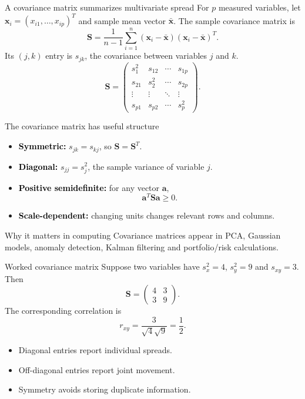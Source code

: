 \documentclass[aspectratio=169,11pt]{beamer}
\newcommand{\key}[1]{\textcolor{black}{\textbf{#1}}}
\begin{document}
\begin{frame}{A covariance matrix summarizes multivariate spread}
For $p$ measured variables, let $\mathbf{x}_i=(x_{i1},\ldots,x_{ip})^T$ and sample mean vector $\bar{\mathbf{x}}$. The sample covariance matrix is
\[
\boxed{\mathbf{S}=\frac{1}{n-1}\sum_{i=1}^{n}(\mathbf{x}_i-\bar{\mathbf{x}})(\mathbf{x}_i-\bar{\mathbf{x}})^T}.
\]
Its $(j,k)$ entry is $s_{jk}$, the covariance between variables $j$ and $k$.
\[
\mathbf{S}=\begin{pmatrix}
s_1^2&s_{12}&\cdots&s_{1p}\\
s_{21}&s_2^2&\cdots&s_{2p}\\
\vdots&\vdots&\ddots&\vdots\\
s_{p1}&s_{p2}&\cdots&s_p^2
\end{pmatrix}.
\]
\end{frame}

\begin{frame}{The covariance matrix has useful structure}
\begin{itemize}
  \item \key{Symmetric:} $s_{jk}=s_{kj}$, so $\mathbf{S}=\mathbf{S}^T$.
  \item \key{Diagonal:} $s_{jj}=s_j^2$, the sample variance of variable $j$.
  \item \key{Positive semidefinite:} for any vector $\mathbf{a}$,
  \[
  \mathbf{a}^T\mathbf{S}\mathbf{a}\ge0.
  \]
  \item \key{Scale-dependent:} changing units changes relevant rows and columns.
\end{itemize}
\begin{block}{Why it matters in computing}
Covariance matrices appear in PCA, Gaussian models, anomaly detection, Kalman filtering and portfolio/risk calculations.
\end{block}
\end{frame}

\begin{frame}{Worked covariance matrix}
Suppose two variables have $s_x^2=4$, $s_y^2=9$ and $s_{xy}=3$. Then
\[
\mathbf{S}=\begin{pmatrix}4&3\\3&9\end{pmatrix}.
\]
The corresponding correlation is
\[
r_{xy}=\frac{3}{\sqrt{4}\sqrt{9}}=\frac12.
\]
\begin{itemize}
  \item Diagonal entries report individual spreads.
  \item Off-diagonal entries report joint movement.
  \item Symmetry avoids storing duplicate information.
\end{itemize}
\end{frame}
\end{document}
